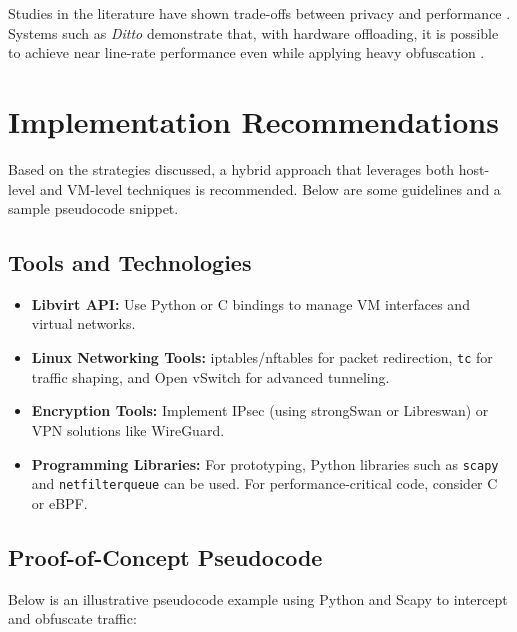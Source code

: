 \documentclass{article}
\begin{document}
Studies in the literature have shown trade-offs between privacy and performance \cite{paddingShaping2019}. Systems such as \emph{Ditto} demonstrate that, with hardware offloading, it is possible to achieve near line-rate performance even while applying heavy obfuscation \cite{ditto2021}.

\section{Implementation Recommendations}
Based on the strategies discussed, a hybrid approach that leverages both host-level and VM-level techniques is recommended. Below are some guidelines and a sample pseudocode snippet.

\subsection{Tools and Technologies}
\begin{itemize}[noitemsep]
    \item \textbf{Libvirt API:} Use Python or C bindings to manage VM interfaces and virtual networks.
    \item \textbf{Linux Networking Tools:} iptables/nftables for packet redirection, \texttt{tc} for traffic shaping, and Open vSwitch for advanced tunneling.
    \item \textbf{Encryption Tools:} Implement IPsec (using strongSwan or Libreswan) or VPN solutions like WireGuard.
    \item \textbf{Programming Libraries:} For prototyping, Python libraries such as \texttt{scapy} and \texttt{netfilterqueue} can be used. For performance-critical code, consider C or eBPF.
\end{itemize}

\subsection{Proof-of-Concept Pseudocode}
Below is an illustrative pseudocode example using Python and Scapy to intercept and obfuscate traffic:
\end{document}
